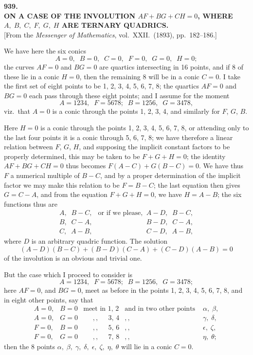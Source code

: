 \documentclass[11pt]{article}
\begin{document}
\begin{center}
\textbf{\large 939.}\\[4pt]
\textbf{ON A CASE OF THE INVOLUTION $AF+BG+CH=0$, WHERE\\
$A,\;B,\;C,\;F,\;G,\;H$ ARE TERNARY QUADRICS.}\\[6pt]
[From the \textit{Messenger of Mathematics}, vol.\ XXII.\ (1893), pp.\ 182--186.]
\end{center}

We have here the six conics
\[ A=0,\;\; B=0,\;\; C=0,\;\; F=0,\;\; G=0,\;\; H=0; \]
the curves $AF=0$ and $BG=0$ are quartics intersecting in 16 points, and if 8 of these lie in a conic $H=0$, then the remaining 8 will be in a conic $C=0$. I take the first set of eight points to be 1, 2, 3, 4, 5, 6, 7, 8; the quartics $AF=0$ and $BG=0$ each pass through these eight points; and I assume for the moment
\[ A=1234,\;\; F=5678;\;\; B=1256,\;\; G=3478, \]
viz.\ that $A=0$ is a conic through the points 1, 2, 3, 4, and similarly for $F$, $G$, $B$.

Here $H=0$ is a conic through the points 1, 2, 3, 4, 5, 6, 7, 8, or attending only to the last four points it is a conic through 5, 6, 7, 8; we have therefore a linear relation between $F$, $G$, $H$, and supposing the implicit constant factors to be properly determined, this may be taken to be $F+G+H=0$; the identity $AF+BG+CH=0$ thus becomes $F(A-C)+G(B-C)=0$. We have thus $F$ a numerical multiple of $B-C$, and by a proper determination of the implicit factor we may make this relation to be $F=B-C$; the last equation then gives $G=C-A$, and from the equation $F+G+H=0$, we have $H=A-B$; the six functions thus are
\[
\begin{array}{ll}
A,\;\; B-C, & \text{or if we please,}\;\; A-D,\;\; B-C,\\
B,\;\; C-A, & \phantom{\text{or if we please,}\;\;} B-D,\;\; C-A,\\
C,\;\; A-B, & \phantom{\text{or if we please,}\;\;} C-D,\;\; A-B,
\end{array}
\]
where $D$ is an arbitrary quadric function. The solution
\[ (A-D)(B-C)+(B-D)(C-A)+(C-D)(A-B)=0 \]
of the involution is an obvious and trivial one.

\medskip
But the case which I proceed to consider is
\[ A=1234,\;\; F=5678;\;\; B=1256,\;\; G=3478; \]
here $AF=0$, and $BG=0$, meet as before in the points 1, 2, 3, 4, 5, 6, 7, 8, and in eight other points, say that
\[
\begin{array}{lllll}
A=0, & B=0 & \text{meet in } 1,\,2 & \text{and in two other points } & \alpha,\;\beta,\\
A=0, & G=0 & \;\;\;\;\;,,\;\;\;\;\; 3,\,4 & ,, & \gamma,\;\delta,\\
F=0, & B=0 & \;\;\;\;\;,,\;\;\;\;\; 5,\,6 & ,, & \epsilon,\;\zeta,\\
F=0, & G=0 & \;\;\;\;\;,,\;\;\;\;\; 7,\,8 & ,, & \eta,\;\theta;
\end{array}
\]
then the 8 points $\alpha,\;\beta,\;\gamma,\;\delta,\;\epsilon,\;\zeta,\;\eta,\;\theta$ will lie in a conic $C=0$.
\end{document}
